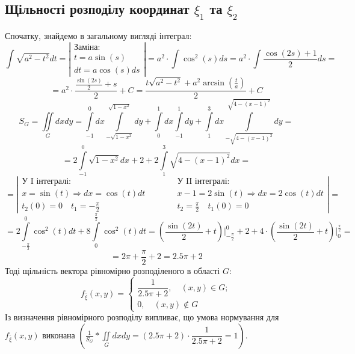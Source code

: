 \documentclass[14pt,a4paper]{scrartcl}
\theoremstyle{definition}
\theoremstyle{remark}
\theoremstyle{definition}
\theoremstyle{definition}
\begin{document}
\subsection{Щільності розподілу координат $\xi_1$ та  $\xi_2$}
Спочатку, знайдемо в загальному вигляді інтеграл:
$$
 \int\limits_{}^{}{\sqrt{a^2 - t^2}dt} = \left| \begin{gathered}
  \text{Заміна:}\\
	t = a\sin{(s)}\\
	dt = a \cos{(s)} ds
 \end{gathered} \right| =  a^2 \cdot \int\limits_{}^{}{\cos^2{(s)}ds } = a^2 \cdot \int{ \frac{\cos{(2s)}+1}{2} ds } =
$$
$$
= a^2 \cdot \frac{ \frac{\sin{(2s)} }{2} +s}{2} +C =   \frac{ t\sqrt{a^2 - t^2} +a^2\arcsin{\left( \frac{t}{a}  \right) }}{2} +C
$$
$$S_{G} =   \iint\limits_{G}{dxdy} =  \int\limits_{-1}^{ 0}{dx  \int\limits_{-\sqrt{1 -x^2}}^{ \sqrt{1 -x^2}}{dy}} +
 \int\limits_{0}^{1}{dx  \int\limits_{-1}^{ 1}{dy}} +  \int\limits_{1}^{3}{dx  \int\limits_{-\sqrt{4 -(x-1)^2}}^{ \sqrt{4 -(x-1)^2}}{dy}} = $$
 $$
 = 2  \int\limits_{-1}^{0}{ \sqrt{1 - x^2}dx} + 2 +  2\int\limits_{1}^{3}{\sqrt{4 -(x-1)^2}dx } = $$
 $$ =\left| \begin{gathered}
\text{У I інтегралі:} \\
 x = \sin{(t)} \Rightarrow dx = \cos{(t)}dt\\
t_2(0) = 0 \quad t_1 = -\frac{\pi}{2}
 \end{gathered} \qquad \quad \begin{gathered}\text{У II інтегралі:} \\
  x-1 = 2\sin{(t)} \Rightarrow dx = 2\cos{(t)}dt\\
  t_2 = \frac{\pi}{2}\quad  t_1(0) = 0
  \end{gathered}\right| =
 $$
$$
=  2\int\limits_{- \frac{\pi}{2} }^{0}{\cos^2{(t)}dt } + 8  \int\limits_{0}^{ \frac{\pi}{2} 	}{ \cos^2{(t)}dt } =
\left( \frac{\sin{(2t)}}{2}   + t  \right)  \Bigg|_{ -\frac{\pi}{2} }^0 + 2 + 4\cdot \left(  \frac{\sin{(2t)}}{2}   + t  \right) \Bigg|^{ \frac{\pi}{2} }_0 =
$$
$$
= 2\pi + \frac{\pi}{2} + 2 = 2.5 \pi + 2
$$
Тоді
щільність
вектора
рівномірно
розподіленого в області $G$:
\def\fx{f_{\overline{\xi}}}
$$
\fx  (x,y ) = \begin{cases}
	\dfrac{1}{ 2.5\pi + 2}, \quad(x,y) \in G; \\
	0, \quad (x,y) \notin G
\end{cases}
$$
Із визначення рівномірного розподілу випливає, що умова нормування для $\fx (x,y)$ виконана $ \left( \frac{1}{S_G}  * \iint\limits_{G}{dxdy} = (2.5\pi +2 )\cdot \dfrac{1}{2.5\pi + 2} =1 \right)$.\\
\end{document}
